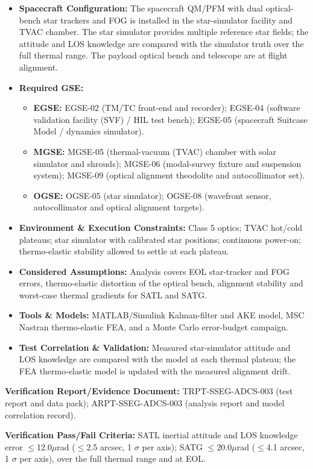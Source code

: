 \begin{itemize}
\item \textbf{Spacecraft Configuration:} The spacecraft QM/PFM with dual optical-bench star trackers and FOG is installed in the star-simulator facility and TVAC chamber. The star simulator provides multiple reference star fields; the attitude and LOS knowledge are compared with the simulator truth over the full thermal range. The payload optical bench and telescope are at flight alignment.
\item \textbf{Required GSE:}
\begin{itemize}
\item \textbf{EGSE:} EGSE-02 (TM/TC front-end and recorder); EGSE-04 (software validation facility (SVF) / HIL test bench); EGSE-05 (spacecraft Suitcase Model / dynamics simulator).
\item \textbf{MGSE:} MGSE-05 (thermal-vacuum (TVAC) chamber with solar simulator and shrouds); MGSE-06 (modal-survey fixture and suspension system); MGSE-09 (optical alignment theodolite and autocollimator set).
\item \textbf{OGSE:} OGSE-05 (star simulator); OGSE-08 (wavefront sensor, autocollimator and optical alignment targets).
\end{itemize}
\item \textbf{Environment \& Execution Constraints:} Class 5 optics; TVAC hot/cold plateaus; star simulator with calibrated star positions; continuous power-on; thermo-elastic stability allowed to settle at each plateau.
\item \textbf{Considered Assumptions:} Analysis covers EOL star-tracker and FOG errors, thermo-elastic distortion of the optical bench, alignment stability and worst-case thermal gradients for SATL and SATG.
\item \textbf{Tools \& Models:} MATLAB/Simulink Kalman-filter and AKE model, MSC Nastran thermo-elastic FEA, and a Monte Carlo error-budget campaign.
\item \textbf{Test Correlation \& Validation:} Measured star-simulator attitude and LOS knowledge are compared with the model at each thermal plateau; the FEA thermo-elastic model is updated with the measured alignment drift.
\end{itemize}
\par\textbf{Verification Report/Evidence Document:} TRPT-SSEG-ADCS-003 (test report and data pack); ARPT-SSEG-ADCS-003 (analysis report and model correlation record).
\par\textbf{Verification Pass/Fail Criteria:} SATL inertial attitude and LOS knowledge error $\le$12.0$\mu$rad ($\le$2.5 arcsec, 1 $\sigma$ per axis); SATG $\le$20.0$\mu$rad ($\le$4.1 arcsec, 1 $\sigma$ per axis), over the full thermal range and at EOL.
\par\medskip
